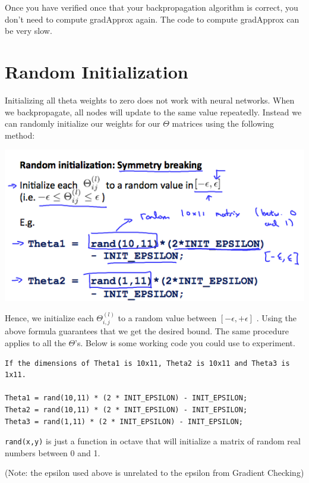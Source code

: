 \documentclass[10pt,a4paper,UTF8]{article}
\begin{document}
Once you have verified once that your backpropagation algorithm is correct, you don't need to compute gradApprox again. The code to compute gradApprox can be very slow.
\section{Random Initialization}
\label{sec:org2f84609}


Initializing all theta weights to zero does not work with neural networks. When we backpropagate, all nodes will update to the same value repeatedly. Instead we can randomly initialize our weights for our \(\Theta\) matrices using the following method:

\begin{center}
\includegraphics[width=.9\linewidth]{../../img/computer_ng/20171014Random.png}
\end{center}

Hence, we initialize each \(\Theta_{i,j}^{(l)}\) to a random value between \([-\epsilon,+\epsilon]\) . Using the above formula guarantees that we get the desired bound. The same procedure applies to all the \(\Theta\)'s. Below is some working code you could use to experiment.

\lstset{language=matlab,label= ,caption= ,captionpos=b,numbers=none}
\begin{lstlisting}
If the dimensions of Theta1 is 10x11, Theta2 is 10x11 and Theta3 is 1x11.

Theta1 = rand(10,11) * (2 * INIT_EPSILON) - INIT_EPSILON;
Theta2 = rand(10,11) * (2 * INIT_EPSILON) - INIT_EPSILON;
Theta3 = rand(1,11) * (2 * INIT_EPSILON) - INIT_EPSILON;
\end{lstlisting}

\texttt{rand(x,y)} is just a function in octave that will initialize a matrix of random real numbers between 0 and 1.

(Note: the epsilon used above is unrelated to the epsilon from Gradient Checking)
\end{document}
